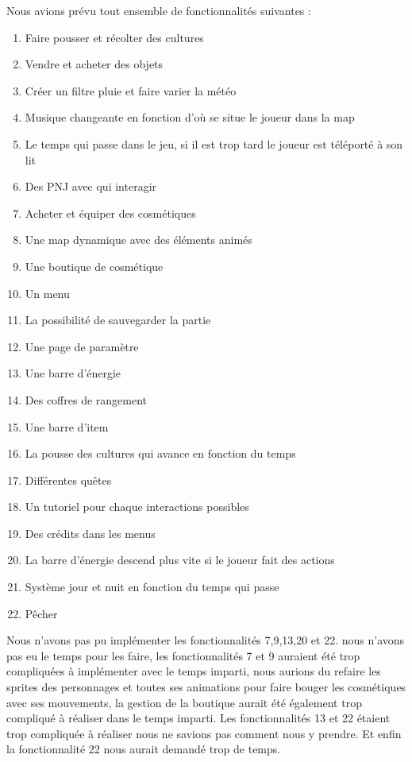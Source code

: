 \documentclass{article}
\begin{document}
\begin{titlepage}
Nous avions prévu tout ensemble de fonctionnalités suivantes : 
\begin{enumerate}
         \item Faire pousser et récolter des cultures
         \item Vendre et acheter des objets
         \item Créer un filtre pluie et faire varier la météo
         \item Musique changeante en fonction d'où se situe le joueur dans la map
         \item Le temps qui passe dans le jeu, si il est trop tard le joueur est téléporté à son lit
         \item Des PNJ avec qui interagir
         \item Acheter et équiper des cosmétiques
         \item Une map dynamique avec des éléments animés
         \item Une boutique de cosmétique
         \item Un menu
         \item La possibilité de sauvegarder la partie
         \item Une page de paramètre
         \item Une barre d'énergie
         \item Des coffres de rangement
         \item Une barre d'item
         \item La pousse des cultures qui avance en fonction du temps
         \item Différentes quêtes
         \item Un tutoriel pour chaque interactions possibles
         \item Des crédits dans les menus
         \item La barre d'énergie descend plus vite si le joueur fait des actions
         \item Système jour et nuit en fonction du temps qui passe
         \item Pêcher
\end{enumerate}
Nous n'avons pas pu implémenter les fonctionnalités 7,9,13,20 et 22. nous n'avons pas eu le temps pour les faire, les fonctionnalités 7 et 9 auraient été trop compliquées à implémenter avec le temps imparti, nous aurions du refaire les sprites des personnages et toutes ses animations pour faire bouger les cosmétiques avec ses mouvements, la gestion de la boutique aurait été également trop compliqué à réaliser dans le temps imparti. Les fonctionnalités 13 et 22 étaient trop compliquée à réaliser nous ne savions pas comment nous y prendre. Et enfin la fonctionnalité 22 nous aurait demandé trop de temps.


\end{titlepage}
\end{document}
